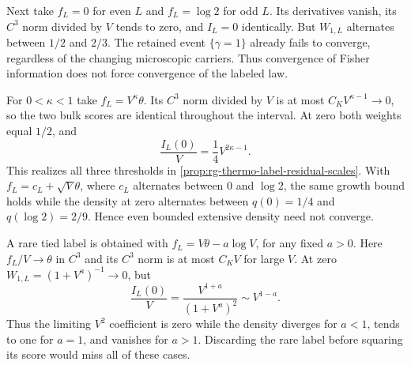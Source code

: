 Next take $f_L=0$ for even $L$ and $f_L=\log2$ for odd $L$.
Its derivatives vanish, its $C^3$ norm divided by $V$ tends to zero,
and $I_L=0$ identically. But $W_{1,L}$ alternates between $1/2$ and
$2/3$. The retained event $\{\gamma=1\}$ already fails to converge,
regardless of the changing microscopic carriers. Thus convergence of
Fisher information does not force convergence of the labeled law.

For $0<\kappa<1$ take $f_L=V^\kappa\theta$. Its $C^3$ norm divided
by $V$ is at most $C_KV^{\kappa-1}\to0$, so the two bulk scores are
identical throughout the interval. At zero both weights equal $1/2$,
and
\begin{equation}
 \frac{I_L(0)}V=\frac14V^{2\kappa-1}.
 \label{eq:rg-thermo-label-subextensive-example}
\end{equation}
This realizes all three thresholds in
\cref{prop:rg-thermo-label-residual-scales}. With
$f_L=c_L+\sqrt V\theta$, where $c_L$ alternates between $0$ and
$\log2$, the same growth bound holds while the density at zero
alternates between $q(0)=1/4$ and $q(\log2)=2/9$. Hence even bounded
extensive density need not converge.

A rare tied label is obtained with
$f_L=V\theta-a\log V$, for any fixed $a>0$. Here
$f_L/V\to\theta$ in $C^3$ and its $C^3$ norm is at most $C_KV$ for
large $V$. At zero $W_{1,L}=(1+V^a)^{-1}\to0$, but
\begin{equation}
 \frac{I_L(0)}V=\frac{V^{1+a}}{(1+V^a)^2}
                 \sim V^{1-a}.
 \label{eq:rg-thermo-label-rare-example}
\end{equation}
Thus the limiting $V^2$ coefficient is zero while the density diverges
for $a<1$, tends to one for $a=1$, and vanishes for $a>1$. Discarding
the rare label before squaring its score would miss all of these cases.

